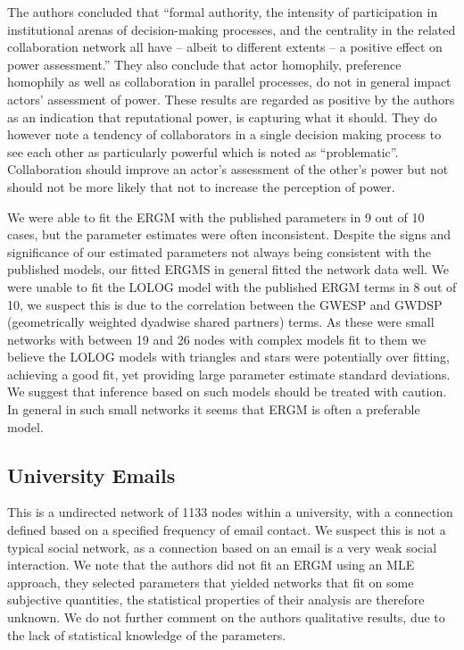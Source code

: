 \documentclass[
]{statsoc}
\begin{document}
The authors concluded that ``formal authority, the intensity of
participation in institutional arenas of decision-making processes, and
the centrality in the related collaboration network all have -- albeit
to different extents -- a positive effect on power assessment.'' They
also conclude that actor homophily, preference homophily as well as
collaboration in parallel processes, do not in general impact actors'
assessment of power. These results are regarded as positive by the
authors as an indication that reputational power, is capturing what it
should. They do however note a tendency of collaborators in a single
decision making process to see each other as particularly powerful which
is noted as ``problematic''. Collaboration should improve an actor's
assessment of the other's power but not should not be more likely that
not to increase the perception of power.

We were able to fit the ERGM with the published parameters in 9 out of
10 cases, but the parameter estimates were often inconsistent. Despite
the signs and significance of our estimated parameters not always being
consistent with the published models, our fitted ERGMS in general fitted
the network data well. We were unable to fit the LOLOG model with the
published ERGM terms in 8 out of 10, we suspect this is due to the
correlation between the GWESP and GWDSP (geometrically weighted dyadwise
shared partners) terms. As these were small networks with between 19 and
26 nodes with complex models fit to them we believe the LOLOG models
with triangles and stars were potentially over fitting, achieving a good
fit, yet providing large parameter estimate standard deviations. We
suggest that inference based on such models should be treated with
caution. In general in such small networks it seems that ERGM is often a
preferable model.

\subsection{University Emails}

This is a undirected network of 1133 nodes within a university, with a
connection defined based on a specified frequency of email contact. We
suspect this is not a typical social network, as a connection based on
an email is a very weak social interaction. We note that the authors did
not fit an ERGM using an MLE approach, they selected parameters that
yielded networks that fit on some subjective quantities, the statistical
properties of their analysis are therefore unknown. We do not further
comment on the authors qualitative results, due to the lack of
statistical knowledge of the parameters.
\end{document}

